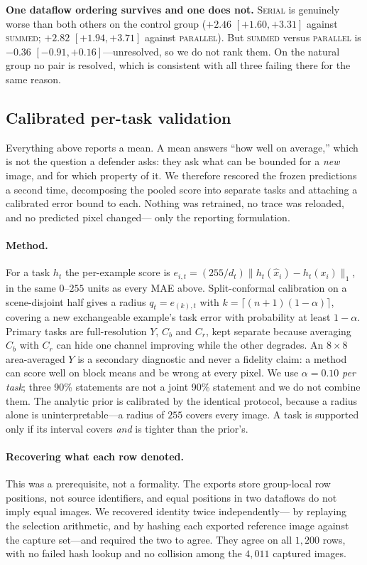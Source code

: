 \documentclass[10pt,conference]{article}
\begin{document}
\textbf{One dataflow ordering survives and one does not.} \textsc{Serial} is genuinely
worse than both others on the control group ($+2.46$ $[+1.60, +3.31]$ against
\textsc{summed}; $+2.82$ $[+1.94, +3.71]$ against \textsc{parallel}). But
\textsc{summed} versus \textsc{parallel} is $-0.36$ $[-0.91, +0.16]$---unresolved, so we
do not rank them. On the natural group no pair is resolved, which is consistent with all
three failing there for the same reason.

\subsection{Calibrated per-task validation}
\label{sec:calibrated}

Everything above reports a mean. A mean answers ``how well on average,'' which is not the
question a defender asks: they ask what can be bounded for a \emph{new} image, and for
which property of it. We therefore rescored the frozen predictions a second time,
decomposing the pooled score into separate tasks and attaching a calibrated error bound
to each. Nothing was retrained, no trace was reloaded, and no predicted pixel changed---
only the reporting formulation.

\paragraph{Method.} For a task $h_t$ the per-example score is
$e_{i,t} = (255/d_t)\lVert h_t(\hat{x}_i) - h_t(x_i)\rVert_1$, in the same $0$--$255$
units as every MAE above. Split-conformal calibration on a scene-disjoint half gives a
radius $q_t = e_{(k),t}$ with $k = \lceil (n+1)(1-\alpha)\rceil$, covering a new
exchangeable example's task error with probability at least $1-\alpha$. Primary tasks are
full-resolution $Y$, $C_b$ and $C_r$, kept separate because averaging $C_b$ with $C_r$
can hide one channel improving while the other degrades. An $8\times8$ area-averaged $Y$
is a secondary diagnostic and never a fidelity claim: a method can score well on block
means and be wrong at every pixel. We use $\alpha = 0.10$ \emph{per task}; three 90\%
statements are not a joint 90\% statement and we do not combine them. The analytic prior
is calibrated by the identical protocol, because a radius alone is uninterpretable---a
radius of $255$ covers every image. A task is supported only if its interval covers
\emph{and} is tighter than the prior's.

\paragraph{Recovering what each row denoted.} This was a prerequisite, not a formality.
The exports store group-local row positions, not source identifiers, and equal positions
in two dataflows do not imply equal images. We recovered identity twice independently---
by replaying the selection arithmetic, and by hashing each exported reference image
against the capture set---and required the two to agree. They agree on all $1{,}200$
rows, with no failed hash lookup and no collision among the $4{,}011$ captured images.
\end{document}
